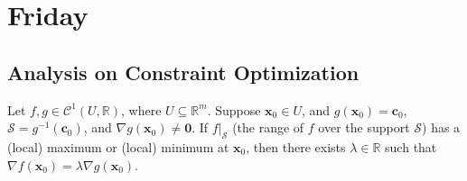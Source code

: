 
\section{Friday}
\subsection{Analysis on Constraint Optimization}
\begin{theorem}
Let $f,g\in\mathcal{C}^1(U,\mathbb{R})$, where $U\subseteq\mathbb{R}^m$. Suppose $\bm x_0\in U$, and $g(\bm x_0)=\bm c_0$, $\mathcal{S}=g^{-1}(\bm c_0)$, and $\nabla g(\bm x_0)\ne\bm0$. If $f|_{\mathcal{S}}$ (the range of $f$ over the support $\mathcal{S}$) has a (local) maximum or (local) minimum at $\bm x_0$, then there exists $\lambda\in\mathbb{R}$ such that $\nabla f(\bm x_0)=\lambda\nabla g(\bm x_0)$.
\end{theorem}
